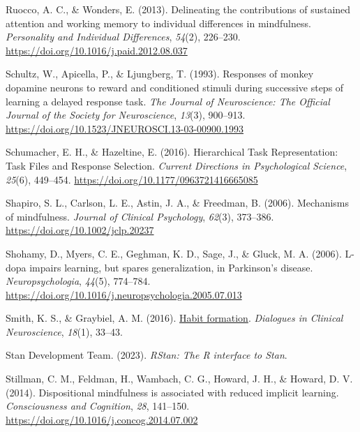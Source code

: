 \documentclass[
  man]{apa6}
\newlength{\cslhangindent}
\newlength{\cslentryspacingunit} %
\newenvironment{CSLReferences}[2] %
 {%
  \setlength{\parindent}{0pt}
  \ifodd #1
  \let\oldpar\par
  \def\par{\hangindent=\cslhangindent\oldpar}
  \fi
  \setlength{\parskip}{#2\cslentryspacingunit}
 }%
 {}
\begin{document}
\begin{CSLReferences}{1}{0}
\leavevmode{}%
Ruocco, A. C., \& Wonders, E. (2013). Delineating the contributions of sustained attention and working memory to individual differences in mindfulness. \emph{Personality and Individual Differences}, \emph{54}(2), 226--230. \url{https://doi.org/10.1016/j.paid.2012.08.037}

\leavevmode{}%
Schultz, W., Apicella, P., \& Ljungberg, T. (1993). Responses of monkey dopamine neurons to reward and conditioned stimuli during successive steps of learning a delayed response task. \emph{The Journal of Neuroscience: The Official Journal of the Society for Neuroscience}, \emph{13}(3), 900--913. \url{https://doi.org/10.1523/JNEUROSCI.13-03-00900.1993}

\leavevmode{}%
Schumacher, E. H., \& Hazeltine, E. (2016). Hierarchical {Task Representation}: {Task Files} and {Response Selection}. \emph{Current Directions in Psychological Science}, \emph{25}(6), 449--454. \url{https://doi.org/10.1177/0963721416665085}

\leavevmode{}%
Shapiro, S. L., Carlson, L. E., Astin, J. A., \& Freedman, B. (2006). Mechanisms of mindfulness. \emph{Journal of Clinical Psychology}, \emph{62}(3), 373--386. \url{https://doi.org/10.1002/jclp.20237}

\leavevmode{}%
Shohamy, D., Myers, C. E., Geghman, K. D., Sage, J., \& Gluck, M. A. (2006). L-dopa impairs learning, but spares generalization, in {Parkinson}'s disease. \emph{Neuropsychologia}, \emph{44}(5), 774--784. \url{https://doi.org/10.1016/j.neuropsychologia.2005.07.013}

\leavevmode{}%
Smith, K. S., \& Graybiel, A. M. (2016). \href{https://www.ncbi.nlm.nih.gov/pmc/articles/PMC4826769}{Habit formation}. \emph{Dialogues in Clinical Neuroscience}, \emph{18}(1), 33--43.

\leavevmode{}%
Stan Development Team. (2023). \emph{{RStan}: The {R} interface to {Stan}}.

\leavevmode{}%
Stillman, C. M., Feldman, H., Wambach, C. G., Howard, J. H., \& Howard, D. V. (2014). Dispositional mindfulness is associated with reduced implicit learning. \emph{Consciousness and Cognition}, \emph{28}, 141--150. \url{https://doi.org/10.1016/j.concog.2014.07.002}


\end{CSLReferences}
\end{document}
